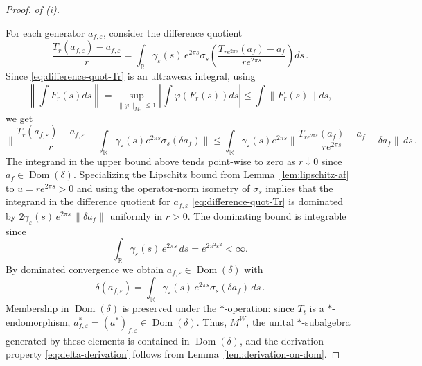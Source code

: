 \documentclass[11pt,a4paper]{article}
\theoremstyle{plain}
\numberwithin{theorem}{section}
\theoremstyle{definition}
\newcommand{\?}{\overset{?}{=}}
\newcommand{\lb}{\left (}
\newcommand{\rb}{\right )}
\newcommand{\lv}{\left\vert}
\newcommand{\rv}{\right\vert}
\newcommand{\I}{\infty}
\newcommand{\vf}{\varphi}
\DeclareMathOperator{\Dom}{Dom}
\begin{document}
\begin{proof}
\emph{of (i).} 

For each generator $a_{f,\varepsilon}$, consider the difference quotient
\begin{equation}\label{eq:difference-quot-Tr}
  \frac{T_r(a_{f,\varepsilon})-a_{f,\varepsilon}}{r}
  =\int_{\mathbb R}\gamma_\varepsilon(s)\, e^{2\pi s}\sigma_s\!\left(\frac{T_{re^{2\pi s}}(a_f)-a_f}{r e^{2\pi s}}\right)ds\,.
\end{equation}
Since \eqref{eq:difference-quot-Tr} is an ultraweak integral, using
\begin{equation*}
    \left\|\int F_r(s)ds\right\| = \sup_{\|\vf\|_{M_*}\leq 1}\lv \int\vf\lb F_r(s)\rb ds\rv \leq \int \|F_r(s)\|ds,
\end{equation*}
we get
\begin{equation*}
    \Bigg\| \frac{T_r(a_{f,\varepsilon})-a_{f,\varepsilon}}{r}-\int_\mathbb{R}\gamma_\varepsilon(s) e^{2\pi s} \sigma_s(\delta a_f)\Bigg\| \leq \int_\mathbb{R}\gamma_\varepsilon(s)e^{2\pi s} \Bigg\|\frac{T_{re^{2\pi s}}(a_f)-a_f}{r e^{2\pi s}}-\delta a_f\Bigg\|\, ds \,.
\end{equation*}
The integrand in the upper bound above tends point-wise to zero as $r\downarrow0$ since $a_f \in \Dom(\delta)$.
Specializing the Lipschitz bound from Lemma~\ref{lem:lipschitz-af} to $u=re^{2\pi s}>0$ and using the operator-norm isometry of $\sigma_s$ implies that the integrand in the difference quotient for $a_{f,\varepsilon}$ \eqref{eq:difference-quot-Tr} is dominated by 
$2\gamma_\varepsilon(s)\,e^{2\pi s}\,\|\delta a_f\|$ uniformly in $r>0$. The dominating bound is integrable since
\begin{equation*}
  \int_{\mathbb R}\gamma_\varepsilon(s)\,e^{2\pi s}\,ds=e^{2\pi^2\varepsilon^2}<\I.
\end{equation*}
By dominated convergence we obtain $a_{f,\varepsilon}\in\Dom(\delta)$ with
\begin{equation}
\label{eq:delta-on-generators}
  \delta(a_{f,\varepsilon})=\int_{\mathbb R}\gamma_\varepsilon(s)\,e^{2\pi s}\sigma_s(\delta a_f)\,ds\,.
\end{equation}
Membership in $\Dom(\delta)$ is preserved under the $*$-operation: since $T_t$ is a $*$-endomorphism, $a_{f,\varepsilon}^*=(a^*)_{\bar f,\varepsilon}\in\Dom(\delta)$. 
Thus, $M^W$, the unital $*$-subalgebra generated by these elements  is contained in $\Dom(\delta)$, and the derivation property \eqref{eq:delta-derivation} follows from Lemma~\ref{lem:derivation-on-dom}.


\end{proof}
\end{document}
